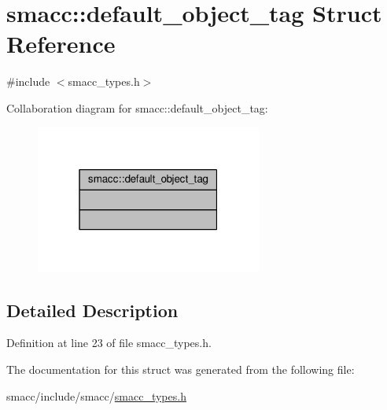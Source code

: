 \hypertarget{structsmacc_1_1default__object__tag}{}\section{smacc\+:\+:default\+\_\+object\+\_\+tag Struct Reference}
\label{structsmacc_1_1default__object__tag}


{\ttfamily \#include $<$smacc\+\_\+types.\+h$>$}



Collaboration diagram for smacc\+:\+:default\+\_\+object\+\_\+tag\+:
\nopagebreak
\begin{figure}[H]
\begin{center}
\leavevmode
\includegraphics[width=211pt]{structsmacc_1_1default__object__tag__coll__graph}
\end{center}
\end{figure}


\subsection{Detailed Description}


Definition at line 23 of file smacc\+\_\+types.\+h.



The documentation for this struct was generated from the following file\+:\begin{DoxyCompactItemize}
\item 
smacc/include/smacc/\hyperlink{smacc__types_8h}{smacc\+\_\+types.\+h}\end{DoxyCompactItemize}
